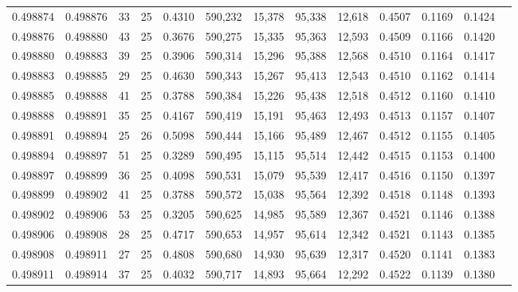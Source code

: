 \begin{tabular}{rrrrrrrrrrrrr}
0.498874 & 0.498876 &    33 &  25 &                                     0.4310 & 590,232 &  15,378 &  95,338 &  12,618 & 0.4507 & 0.1169 & 0.1424 \\
0.498876 & 0.498880 &    43 &  25 &                                     0.3676 & 590,275 &  15,335 &  95,363 &  12,593 & 0.4509 & 0.1166 & 0.1420 \\
0.498880 & 0.498883 &    39 &  25 &                                     0.3906 & 590,314 &  15,296 &  95,388 &  12,568 & 0.4510 & 0.1164 & 0.1417 \\
0.498883 & 0.498885 &    29 &  25 &                                     0.4630 & 590,343 &  15,267 &  95,413 &  12,543 & 0.4510 & 0.1162 & 0.1414 \\
0.498885 & 0.498888 &    41 &  25 &                                     0.3788 & 590,384 &  15,226 &  95,438 &  12,518 & 0.4512 & 0.1160 & 0.1410 \\
0.498888 & 0.498891 &    35 &  25 &                                     0.4167 & 590,419 &  15,191 &  95,463 &  12,493 & 0.4513 & 0.1157 & 0.1407 \\
0.498891 & 0.498894 &    25 &  26 &                                     0.5098 & 590,444 &  15,166 &  95,489 &  12,467 & 0.4512 & 0.1155 & 0.1405 \\
0.498894 & 0.498897 &    51 &  25 &                                     0.3289 & 590,495 &  15,115 &  95,514 &  12,442 & 0.4515 & 0.1153 & 0.1400 \\
0.498897 & 0.498899 &    36 &  25 &                                     0.4098 & 590,531 &  15,079 &  95,539 &  12,417 & 0.4516 & 0.1150 & 0.1397 \\
0.498899 & 0.498902 &    41 &  25 &                                     0.3788 & 590,572 &  15,038 &  95,564 &  12,392 & 0.4518 & 0.1148 & 0.1393 \\
0.498902 & 0.498906 &    53 &  25 &                                     0.3205 & 590,625 &  14,985 &  95,589 &  12,367 & 0.4521 & 0.1146 & 0.1388 \\
0.498906 & 0.498908 &    28 &  25 &                                     0.4717 & 590,653 &  14,957 &  95,614 &  12,342 & 0.4521 & 0.1143 & 0.1385 \\
0.498908 & 0.498911 &    27 &  25 &                                     0.4808 & 590,680 &  14,930 &  95,639 &  12,317 & 0.4520 & 0.1141 & 0.1383 \\
0.498911 & 0.498914 &    37 &  25 &                                     0.4032 & 590,717 &  14,893 &  95,664 &  12,292 & 0.4522 & 0.1139 & 0.1380 \\

\end{tabular}
